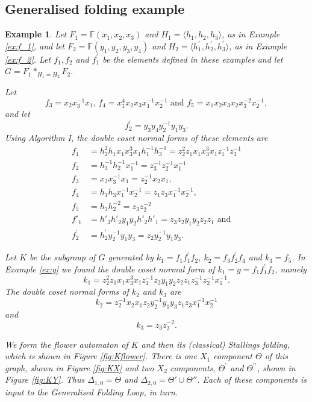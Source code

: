 \documentclass[a4paper,12pt]{article}
\newcommand{\D}{\Delta }
\newcommand{\T}{\Theta }
\newtheorem{exam}[theorem]{Example}
\newenvironment{example}{\begin{exam} \rm}{\end{exam}}
\numberwithin{equation}{section}
\numberwithin{figure}{section}
\newcommand{\FF}{\ensuremath{\mathbb{F}}}
\newcommand{\la}{\langle}
\newcommand{\ra}{\rangle}
\begin{document}
\subsection{Generalised folding example}
\begin{example}\label{ex:K}
Let $F_1=\FF(x_1,x_2,x_3)$ and $H_1=\la h_1,h_2,h_3\ra$,
as in Example \ref{ex:f_1}, and let $F_2=\FF(y_1,y_2,y_3,y_4)$ and
$H_2=\la h_1^\prime, h_2^\prime, h_3^\prime\ra$, as in Example \ref{ex:f_2}.
Let $f_1,f_2$ and $f_1^\prime$ be the elements defined in these examples
 and let $G=F_1\ast_{H_1=H_2} F_2$.

Let
\[f_3=x_2x_3^{-1}x_1,\, f_4= x_1^4 x_2 x_3 x_1^{-1} x_2^{-1}
\textrm{ and } f_5=x_1x_2x_3x_2x_3^{-2}x_2^{-1},\]
and let
\[ f_2^\prime =y_3y_4y_2^{-1}y_1y_3.\]
Using Algorithm I, the double coset normal forms of these elements are
\begin{align*}
f_1&=h_2^{2}h_1 x_1x_3^3x_1 h_1^{-1}h_3^{-1}=z_2^{2}z_1 x_1x_3^3x_1 z_1^{-1}z_3^{-1}\\
f_2&=h_3^{-1}h_2^{-1} x_1^{-1}=z_3^{-1}z_2^{-1} x_1^{-1}\\
f_3 & = x_2x_3^{-1}x_1=z_2^{-1}x_2x_1,\\
f_4 &= h_1h_3 x_1^{-1}x_2^{-1}=z_1z_3 x_1^{-1}x_2^{-1},\\
f_5 &= h_3h_2^{-2}=z_3z_2^{-2}\\
f'_1&=h'_3h'_2y_1y_2h'_2h'_1=z_3z_2y_1y_2z_2z_1\textrm{ and }\\
f_2^\prime &= h_2^\prime y_2^{-1}y_1y_3= z_2 y_2^{-1}y_1y_3.
\end{align*}

Let $K$ be the subgroup of $G$ generated by $k_1=f_1f_1^\prime f_2$,
$k_2= f_3f_2^\prime f_4$ and $k_3=f_5$.
In Example \ref{ex:g} we found the double coset normal form of
$k_1=g=f_1f_1^\prime f_2$, namely
\[k_1=z_2^2 z_1  x_1 x_3^3 x_1 z_1^{-1}
z_2y_1y_2 z_2z_1
z_3^{-1}z_2^{-1} x_1^{-1}.\]
The double coset normal forms of $k_2$ and $k_3$ are
\[k_2=  z_2^{-1}x_2x_1  z_2 y_2^{-1}y_1y_3 z_1z_3 x_1^{-1}x_2^{-1}\]
and
\[k_3 = z_3z_2^{-2}.\]

We form the flower automaton of $K$ and then its (classical) Stallings folding,
which is
shown in Figure \ref{fig:Kflower}.
There is one $X_1$ component $\Theta$ of this graph, shown in Figure \ref{fig:KX}
and two $X_2$ components, $\Theta^\prime$ and $\Theta^{\prime\prime}$,
shown in Figure \ref{fig:KY}. Thus $\D_{1,0}=\Theta$ and 
$\D_{2,0}=\T'\cup \T''$. Each of these components is input to
 the Generalised Folding Loop, in turn.  


\end{example}
\end{document}

